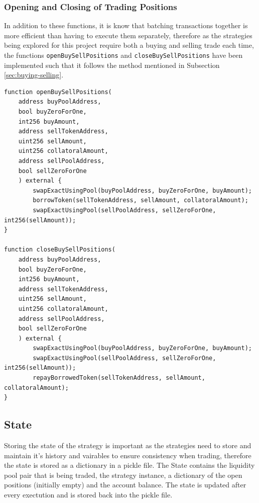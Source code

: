 \subsubsection{Opening and Closing of Trading Positions}
In addition to these functions, it is know that batching transactions together is more efficient than having to execute them separately, therefore as the strategies being explored for this project require both a buying and selling trade each time, the functions \texttt{openBuySellPositions} and \texttt{closeBuySellPositions} have been implemented such that it follows the method mentioned in Subsection \ref{sec:buying-selling}.

\begin{lstlisting}
function openBuySellPositions(
    address buyPoolAddress,
    bool buyZeroForOne,
    int256 buyAmount,
    address sellTokenAddress,
    uint256 sellAmount,
    uint256 collatoralAmount,
    address sellPoolAddress,
    bool sellZeroForOne
    ) external {
        swapExactUsingPool(buyPoolAddress, buyZeroForOne, buyAmount);
        borrowToken(sellTokenAddress, sellAmount, collatoralAmount);
        swapExactUsingPool(sellPoolAddress, sellZeroForOne, int256(sellAmount));
}

function closeBuySellPositions(
    address buyPoolAddress,
    bool buyZeroForOne,
    int256 buyAmount,
    address sellTokenAddress,
    uint256 sellAmount,
    uint256 collatoralAmount,
    address sellPoolAddress,
    bool sellZeroForOne
    ) external {
        swapExactUsingPool(buyPoolAddress, buyZeroForOne, buyAmount);
        swapExactUsingPool(sellPoolAddress, sellZeroForOne, int256(sellAmount));
        repayBorrowedToken(sellTokenAddress, sellAmount, collatoralAmount);
}
\end{lstlisting}

\subsection{State}
Storing the state of the strategy is important as the strategies need to store and maintain it's history and vairables to ensure consistency when trading, therefore the state is stored as a dictionary in a pickle file. The State contains the liquidity pool pair that is being traded, the strategy instance, a dictionary of the open positions (initially empty) and the account balance. The state is updated after every exectution and is stored back into the pickle file.

